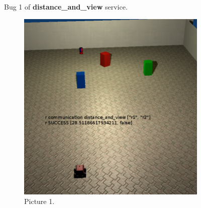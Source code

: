 \begin{enumerate}
\begin{enumerate}
\begin{figure}[!ht]
\begin{center}
\end{center}
\caption{Bug 1 of \textbf{distance\_and\_view} service. \label{view_bug1}}
\end{figure}

\begin{figure}[!ht] %
\begin{center}
\begin{subfigure}[!ht]{0.48\textwidth}
  \centering
  \includegraphics[width=\textwidth]{Bug_Pics/Distance_and_View/distance_and_view_21.png}
  \caption{Picture 1.}
\end{subfigure}
~
\begin{subfigure}[!ht]{0.48\textwidth}
  \centering

\end{subfigure}
\end{center}
\end{figure}
\end{enumerate}
\end{enumerate}
